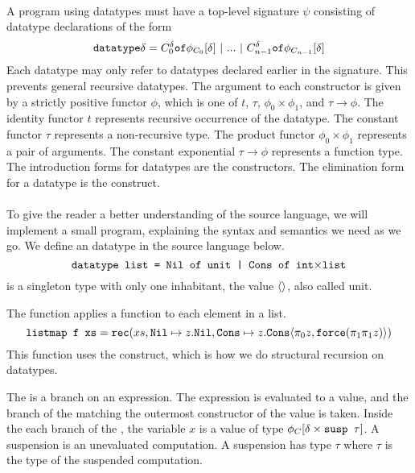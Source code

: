 \paragraph{}
A program using datatypes must have a top-level signature $\psi$ consisting of
datatype declarations of the form
%
\[ \T{datatype} \delta = C^\delta_0 \T{of} \phi_{C_0}[\delta] \ |\ ...\ |\ C^\delta_{n-1} \T{of} \phi_{C_{n-1}}[\delta] \]
%
Each datatype may only refer to datatypes declared earlier in the signature.
This prevents general recursive datatypes.  The argument to each constructor is
given by a strictly positive functor $\phi$, which is one of $t$, $\tau$,
$\phi_0 \times \phi_1$, and $\tau \rightarrow \phi$.  The identity functor $t$
represents recursive occurrence of the datatype.  The constant functor $\tau$
represents a non-recursive type.  The product functor $\phi_0 \times \phi_1$
represents a pair of arguments.  The constant exponential $\tau \rightarrow \phi$
represents a function type.  The introduction forms for datatypes are the
constructors.  The elimination form for a datatype is the  construct.

\paragraph{}
To give the reader a better understanding of the source language, we will
implement a small program, explaining the syntax and semantics we need as we
go.  We define an  datatype in the source language below.
%
\[
  \T{datatype list = Nil of unit | Cons of int$\times$list}
\]
%
 is a singleton type with only one inhabitant, the value
$\LP\RP$, also called unit.


The  function applies a function to each element in a list.
%
\[
  \T{listmap f xs} = \T{rec}(xs, \T{Nil} \mapsto z.\T{Nil}, \T{Cons} \mapsto z.\T{Cons}\LP\pi_0 z, \T{force}(\pi_1\pi_1 z)\RP)
\]
%
This function uses the  construct, which is how we do structural
recursion on datatypes.
%
\begin{prooftree}
\end{prooftree}
%
The  is a branch on an expression. The expression is evaluated to a
value, and the branch of the  matching the outermost constructor of the
value is taken. Inside the each branch of the , the variable $x$ is a
value of type $\phi_C[\delta \times \T{susp } \tau]$. A suspension is an
unevaluated computation.  A suspension has type  $\tau$ where $\tau$ is
the type of the suspended computation.

